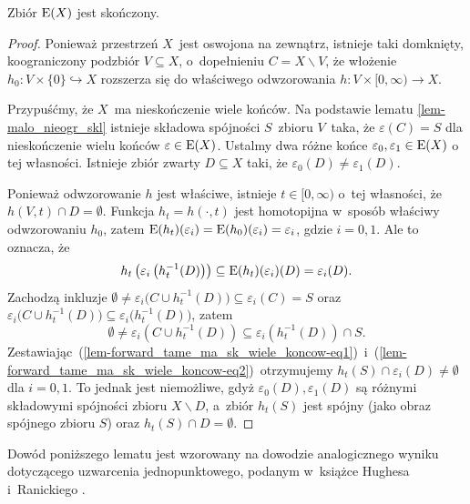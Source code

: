 \begin{lem}\label{lem-forward_tame_ma_sk_wiele_koncow}
Zbiór $\mathrm{E}(X)$ jest skończony.
\end{lem}
\begin{proof}
Ponieważ przestrzeń $X$~jest oswojona na zewnątrz, istnieje taki domknięty, koograniczony podzbiór $V\subseteq X$, o~dopełnieniu $C=X\smallsetminus V$, że włożenie $h_0\colon V\times\{0\}\hookrightarrow X$ rozszerza się do właściwego odwzorowania \mbox{$h\colon V\times [0,\infty)\to X$}.

Przypuśćmy, że $X$~ma nieskończenie wiele końców. Na podstawie lematu \ref{lem-malo_nieogr_skl} istnieje składowa spójności $S$~zbioru $V$~taka, że $\varepsilon(C)=S$ dla nieskończenie wielu końców $\varepsilon\in \mathrm{E}(X)$. Ustalmy dwa różne końce $\varepsilon_0,\varepsilon_1\in\mathrm{E}(X)$ o tej własności. Istnieje zbiór zwarty $D\subseteq X$ taki, że $\varepsilon_0(D)\not=\varepsilon_1(D)$. 

Ponieważ odwzorowanie $h$ jest właściwe, istnieje $t\in [0,\infty)$ o~tej własności, że $h(V,t)\cap D=\emptyset$. Funkcja $h_t=h(\cdot,t)$ jest homotopijna w~sposób właściwy odwzorowaniu $h_0$, zatem $\mathrm{E}(h_t)(\varepsilon_i)=\mathrm{E}(h_0)(\varepsilon_i)=\varepsilon_i$, gdzie $i=0,1$. Ale to oznacza, że 
\begin{equation}\label{lem-forward_tame_ma_sk_wiele_koncow-eq1} 
h_t\left(\varepsilon_i\left(h_t^{-1}(D)\right)\right)\subseteq \mathrm{E}(h_t)(\varepsilon_i)(D)=\varepsilon_i(D).
\end{equation}
Zachodzą inkluzje $\emptyset\not=\varepsilon_i\bigl(C\cup h_t^{-1}(D)\bigr)\subseteq \varepsilon_i(C)=S$ oraz $\varepsilon_i\bigl(C\cup h_t^{-1}(D)\bigr)\subseteq \varepsilon_i\bigl(h_t^{-1}(D)\bigr)$, zatem \begin{equation}\label{lem-forward_tame_ma_sk_wiele_koncow-eq2}\emptyset\not=\varepsilon_i\left(C\cup h_t^{-1}(D)\right)\subseteq \varepsilon_i\left(h_t^{-1}(D)\right)\cap S.\end{equation} Zestawiając~(\ref{lem-forward_tame_ma_sk_wiele_koncow-eq1})~i~(\ref{lem-forward_tame_ma_sk_wiele_koncow-eq2})~otrzymujemy $h_t(S)\cap\varepsilon_i(D)\not=\emptyset$ dla $i=0,1$. To jednak jest niemożliwe, gdyż $\varepsilon_0(D),\varepsilon_1(D)$ są różnymi składowymi spójności zbioru $X\smallsetminus D$, a~zbiór $h_t(S)$ jest spójny (jako obraz spójnego zbioru $S$) oraz $h_t(S)\cap D=\emptyset$.
\end{proof}

Dowód poniższego lematu jest wzorowany na dowodzie analogicznego wyniku dotyczącego uzwarcenia jednopunktowego, podanym w~książce Hughesa i~Ranickiego \cite{Hughes96}.  

